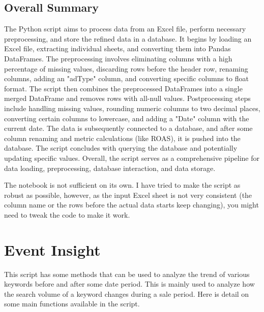 \subsection{Overall Summary}
The Python script aims to process data from an Excel file, perform necessary preprocessing, and store the refined data in a database. It begins by loading an Excel file, extracting individual sheets, and converting them into Pandas DataFrames. The preprocessing involves eliminating columns with a high percentage of missing values, discarding rows before the header row, renaming columns, adding an "adType" column, and converting specific columns to float format. The script then combines the preprocessed DataFrames into a single merged DataFrame and removes rows with all-null values. Postprocessing steps include handling missing values, rounding numeric columns to two decimal places, converting certain columns to lowercase, and adding a "Date" column with the current date. The data is subsequently connected to a database, and after some column renaming and metric calculations (like ROAS), it is pushed into the database. The script concludes with querying the database and potentially updating specific values. Overall, the script serves as a comprehensive pipeline for data loading, preprocessing, database interaction, and data storage.

\begin{outline}
    The notebook is not sufficient on its own. I have tried to make the script as robust as possible, however, as the input Excel sheet is not very consistent (the column name or the rows before the actual data starts keep changing), you might need to tweak the code to make it work.
\end{outline}

\section{Event Insight}

This script has some methods that can be used to analyze the trend of various keywords before and after some date period. This is mainly used to analyze how the search volume of a keyword changes during a sale period. Here is detail on some main functions available in the script.

